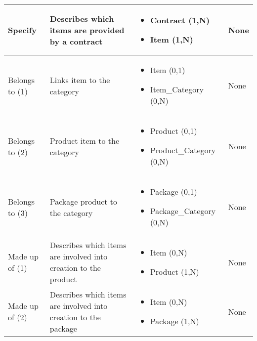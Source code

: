\begin{longtable}{|p{}|p{} |p{}|p{} |}
Specify & Describes which items are provided by a contract  & \begin{itemize}
	\vspace{-1em}
	\item Contract (1,N)
	\item Item (1,N)
	\end{itemize}
&  None\\\hline

Belongs to (1) & Links item to the category  & \begin{itemize}
	\vspace{-1em}
	\item Item (0,1)
	\item Item\_Category (0,N)
\end{itemize}
&  None \\\hline


Belongs to (2) & Product item to the category & \begin{itemize}
	\vspace{-1em}
	\item Product (0,1)
	\item Product\_Category (0,N)
\end{itemize}
&  None \\\hline

Belongs to (3) & Package product to the category  & \begin{itemize}
	\vspace{-1em}
	\item Package (0,1)
	\item Package\_Category (0,N)
\end{itemize}
&  None \\\hline

Made up of (1) & Describes which items are involved into creation to the product & \begin{itemize}
	\vspace{-1em}
	\item Item (0,N)
	\item Product (1,N)
\end{itemize}
&  None \\\hline

Made up of (2) & Describes which items are involved into creation to the package & \begin{itemize}
	\vspace{-1em}
	\item Item (0,N)
	\item Package (1,N)
\end{itemize}
&  None \\\hline



\end{longtable}
